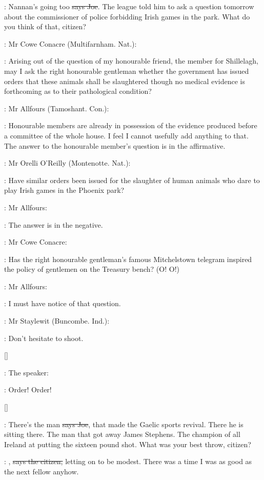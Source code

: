 \joe:
Nannan's going too \sout{says Joe}.
The league told him to ask a question
tomorrow about the commissioner of police forbidding Irish games in the
park. What do you think of that, citizen?

:
Mr Cowe Conacre (Multifarnham. Nat.):

\conacre:
Arising out of the question of my
honourable friend, the member for Shillelagh, may I ask the right
honourable gentleman whether the government has issued orders that these
animals shall be slaughtered though no medical evidence is forthcoming as
to their pathological condition?

:
Mr Allfours (Tamoshant. Con.):

\allfours:
Honourable members are already in
possession of the evidence produced before a committee of the whole house.
I feel I cannot usefully add anything to that. The answer to the
honourable member's question is in the affirmative.

:
Mr Orelli O'Reilly (Montenotte. Nat.): 

\oreilly:
Have similar orders been issued for
the slaughter of human animals who dare to play Irish games in the
Phoenix park?

:
Mr Allfours: 

\allfours:
The answer is in the negative.

:
Mr Cowe Conacre: 

\conacre:
Has the right honourable gentleman's famous
Mitchelstown telegram inspired the policy of gentlemen on the Treasury
bench? (O! O!)

:
Mr Allfours: 

\allfours:
I must have notice of that question.

:
Mr Staylewit (Buncombe. Ind.): 

\staylewit:
Don't hesitate to shoot.

[]

:
The speaker:

\Speaker:
Order! Order!

[]

\joe:
There's the man \sout{says Joe},
that made the Gaelic sports revival. There he
is sitting there. The man that got away James Stephens. The champion of
all Ireland at putting the sixteen pound shot. What was your best throw,
citizen?

\citizen:
, \sout{says the citizen,}
letting on to be modest. There was a time
I was as good as the next fellow anyhow.

